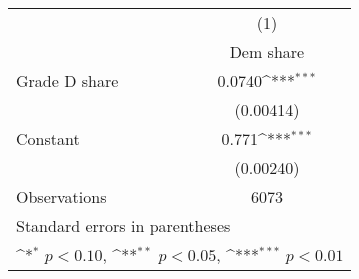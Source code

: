 {
\def\sym#1{\ifmmode^{#1}\else\(^{#1}\)\fi}
\begin{tabular}{l*{1}{c}}
\toprule
                    &\multicolumn{1}{c}{(1)}\\
                    &\multicolumn{1}{c}{Dem share}\\
\midrule
Grade D share       &      0.0740\sym{***}\\
                    &   (0.00414)         \\
\addlinespace
Constant            &       0.771\sym{***}\\
                    &   (0.00240)         \\
\midrule
Observations        &        6073         \\
\bottomrule
\multicolumn{2}{l}{\footnotesize Standard errors in parentheses}\\
\multicolumn{2}{l}{\footnotesize \sym{*} \(p<0.10\), \sym{**} \(p<0.05\), \sym{***} \(p<0.01\)}\\
\end{tabular}
}

